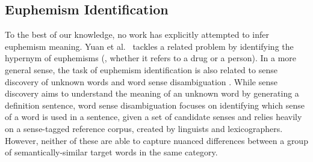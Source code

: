 




\subsection{Euphemism Identification}
\label{sec:related_iden}
To the best of our knowledge, no work has explicitly attempted to infer euphemism meaning.
Yuan et al.\ \cite{yuan2018reading} tackles a related problem by identifying the hypernym of euphemisms (\eg, whether it refers to a drug or a person).
In a more general sense, the task of euphemism identification is also related to sense discovery of unknown words \cite{ishiwatari2019learning,ni2017learning} and word sense disambiguation \cite{taghipour2015semi,raganato2017neural,raganato2017word,iacobacci2016embeddings}. 
While sense discovery aims to understand the meaning of an unknown word by generating a definition sentence,  
word sense disambiguation focuses on identifying which sense of a word is used in a sentence, given a set of candidate senses and relies heavily on a sense-tagged reference corpus, created by linguists and lexicographers.
However, neither of these are able to capture nuanced differences between a group of semantically-similar target words in the same category. 

